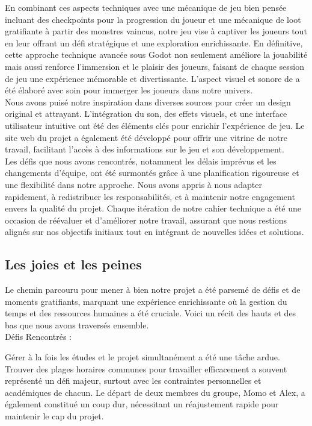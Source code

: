 En combinant ces aspects techniques avec une mécanique de jeu bien pensée incluant des checkpoints pour la progression du joueur et une mécanique de loot gratifiante
à partir des monstres vaincus, notre jeu vise à captiver les joueurs tout en leur offrant un défi stratégique et une exploration enrichissante. En définitive, cette
approche technique avancée sous Godot non seulement améliore la jouabilité mais aussi renforce l'immersion et le plaisir des joueurs, faisant de chaque session de jeu une
expérience mémorable et divertissante.
L'aspect visuel et sonore de \gameName a été élaboré avec soin pour immerger les joueurs dans notre univers.
\\

Nous avons puisé notre inspiration dans diverses sources pour créer un design original et attrayant.
L'intégration du son, des effets visuels, et une interface utilisateur intuitive ont été des éléments clés pour enrichir l'expérience de jeu.
Le site web du projet a également été développé pour offrir une vitrine de notre travail, facilitant l'accès à des informations sur le jeu et son développement.
\\

Les défis que nous avons rencontrés, notamment les délais imprévus et les changements d'équipe, ont été surmontés grâce à une planification rigoureuse
et une flexibilité dans notre approche. Nous avons appris à nous adapter rapidement, à redistribuer les responsabilités, et à maintenir notre engagement
envers la qualité du projet. Chaque itération de notre cahier technique a été une occasion de réévaluer et d'améliorer notre travail, assurant que nous
restions alignés sur nos objectifs initiaux tout en intégrant de nouvelles idées et solutions.
\\

\subsection{Les joies et les peines}

Le chemin parcouru pour mener à bien notre projet a été parsemé de défis et de moments gratifiants, marquant une expérience enrichissante où la gestion du
temps et des ressources humaines a été cruciale. Voici un récit des hauts et des bas que nous avons traversés ensemble.
\\

Défis Rencontrés :

Gérer à la fois les études et le projet simultanément a été une tâche ardue. Trouver des plages horaires communes pour travailler efficacement a souvent
représenté un défi majeur, surtout avec les contraintes personnelles et académiques de chacun. Le départ de deux membres du groupe, Momo et Alex,
a également constitué un coup dur, nécessitant un réajustement rapide pour maintenir le cap du projet.
\\

